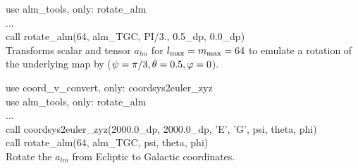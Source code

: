 \begin{example}
{
use alm\_tools, only: rotate\_alm \\
...\\
call rotate\_alm(64, alm\_TGC, PI/3., 0.5\_dp, 0.0\_dp)  \\
}
{
Transforms scalar and tensor $a_{lm}$ for $\ell_{\rm
  max}=m_{\rm max} = 64$ to emulate a rotation of the underlying map by
($\psi=\pi/3, \theta=0.5, \varphi=0\myhtmlimage{}$).
}
\end{example}

\begin{example}
{
use coord\_v\_convert, only: coordsys2euler\_zyz \\
use alm\_tools, only: rotate\_alm \\
...\\
call coordsys2euler\_zyz(2000.0\_dp, 2000.0\_dp, 'E', 'G', psi, theta, phi) \\
call rotate\_alm(64, alm\_TGC, psi, theta, phi)  \\
}
{
Rotate the $a_{lm}$ from Ecliptic to Galactic coordinates.
}
\end{example}


